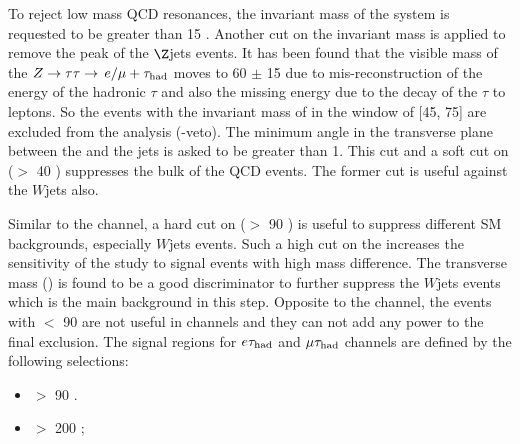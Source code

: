 To reject low mass QCD resonances, the invariant mass of the \leptonTau system  is requested to be greater than 15 \GeV. 
Another cut on the invariant mass is applied to remove the peak of the $\Z$jets events. 
It has been found that the visible mass of the $Z\to\tau\tau\to\,e/\mu +\tau_{\rm had}$ moves to 60 $\pm$ 15 \GeV due to 
mis-reconstruction of the energy of the hadronic $\tau$ and also the missing energy due to the decay of the $\tau$ to leptons. 
So the events with the invariant mass of \leptonTau in the window of [45, 75] are excluded from the analysis (\Z-veto). 
The minimum angle in the transverse plane between the \MET and the jets %
is asked to be greater than 1. This cut and a soft cut on \mttwo ($>$ 40 \GeV) suppresses the bulk of the QCD events. The former cut is useful 
against the $W$jets also.

Similar to the \tauTau channel, a hard cut on \mttwo ($>$ 90 \GeV) is useful to suppress different SM backgrounds, especially $W$jets events.
Such a high cut on the \mttwo increases the sensitivity of the study to signal events with high mass difference. The \Tau transverse mass (\tauMT)
is found to be a good discriminator to further suppress the $W$jets events which is the main background in this step. 
Opposite to the \tauTau channel, the events with \mttwo $<$ 90 \GeV are not useful in \leptonTau channels and they can not add any power to 
the final exclusion. The signal regions for $e\tau_{\rm had}$ and $\mu\tau_{\rm had}$ channels are defined by the following selections:
\begin{itemize}
\item \mttwo $>$ 90 \GeV.
\item \tauMT $>$ 200 \GeV; 
\end{itemize}


